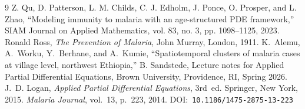 \documentclass[12pt]{article}
\begin{document}
\newpage
\begin{thebibliography}{9}
Z. Qu, D. Patterson, L. M. Childs, C. J. Edholm, J. Ponce, O. Prosper, and L. Zhao, “Modeling immunity to malaria with an age-structured PDE framework,” SIAM Journal on Applied Mathematics, vol. 83, no. 3, pp. 1098–1125, 2023. 
Ronald Ross, \textit{The Prevention of Malaria}, John Murray, London, 1911.
K.~Alemu, A.~Worku, Y.~Berhane, and A.~Kumie,
``Spatiotemporal clusters of malaria cases at village level, northwest Ethiopia,''
B. Sandstede, Lecture notes for Applied Partial Differential Equations, Brown University, Providence, RI, Spring 2026.
J.~D. Logan, \textit{Applied Partial Differential Equations}, 3rd~ed. Springer, New York, 2015.
\textit{Malaria Journal}, vol.~13, p.~223, 2014.
DOI:~\texttt{10.1186/1475-2875-13-223}
\end{thebibliography}
\end{document}
